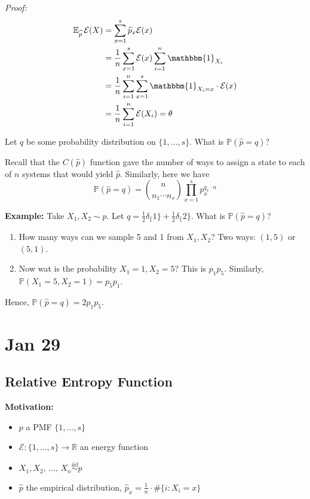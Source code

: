 \documentclass[12pt]{article}
\renewcommand{\hat}[1]{\widehat{#1}}
\renewcommand{\P}{\mathbb{P}}
\newcommand{\R}{\mathbb{R}}
\newcommand{\E}{\mathbb{E}}
\newcommand{\ind}{\mathbbm{1}}
\newcommand{\Ec}{\mathcal{E}}
\newcommand{\iid}{\overset{\text{iid}}{\sim}}
\newcommand*{\tbf}[1]{\ifmmode\mathbf{#1}\else\textbf{#1}\fi}
\newenvironment*{tbox}[2][gray]{
    \begin{tcolorbox}[
        parbox=false,
        colback=#1!5!white,
        colframe=#1!75!black,
        breakable,
        title={#2}
    ]}
    {\end{tcolorbox}}
\begin{document}
\begin{tbox}{\textbf{Large Deviation Principle:} Take $p$ on $\{1, 2, \dots, s\}$, $\Ec: \{1, \dots, s\} \to \R$. Observe $X_1, X_2, \, \dots,\, X_n \overset{\text{iid}}{\sim} p$. Define
        \[\frac{1}{n}\sum_{x=1}^n \Ec(X_k) = \theta\]. Define the empirical distribution $\hat p_x = \frac{1}{n}\cdot \#\{i: X_i = x\}$. Then $\E_{\hat p}\, \Ec(X) = \theta$}

    \emph{Proof:}
    \begin{align*}
        \E_{\hat p}\, \Ec(X) & = \sum_{x=1}^s \hat p_x \Ec(x)                                   \\
                             & = \frac{1}{n}\sum_{x=1}^s \Ec(x) \sum_{i=1}^n \ind_{X_i}         \\
                             & = \frac{1}{n}\sum_{i=1}^n \sum_{x=1}^s \ind_{X_i=x} \cdot \Ec(x) \\
                             & = \frac{1}{n} \sum_{i=1}^{n} \Ec(X_i) = \theta
    \end{align*}
\end{tbox}

Let $q$ be some probability distribution on $\{1, \dots, s\}$. What is $\P(\hat p = q)$?

Recall that the $C(\hat p)$ function gave the number of ways to assign a state to each of $n$ systems that would yield $\hat p$. Similarly, here we have
\[\P(\hat p = q) = \binom{n}{n_1 \cdots n_s} \prod_{x=1}^s p_x^{q_x \cdot n}\]

\tbf{Example:} Take $X_1, X_2 \sim p$. Let $q = \frac{1}{2} \delta_\{1\} + \frac{1}{2} \delta_\{2\}$. What is $\P(\hat p = q)$?
\begin{enumerate}
    \item How many ways can we sample 5 and 1 from $X_1, X_2$? Two ways: $(1, 5)$ or $(5, 1)$.
    \item Now wat is the probability $X_1 = 1, X_2 = 5$? This is $p_1 p_5$. Similarly, $\P(X_1 = 5, X_2 = 1) = p_5 p_1$.
\end{enumerate}

Hence, $\P(\hat p = q) = 2p_1 p_5$.

\section{Jan 29}
\subsection{Relative Entropy Function}
\tbf{Motivation:}
\begin{itemize}
    \item $p$ a PMF $\{1, \dots, s\}$
    \item $\Ec: \{1, \dots, s\} \to \R$ an energy function
    \item $X_1, X_2, \, \dots,\, X_n \iid p$
    \item $\hat p$ the empirical distribution, $\hat p_x = \frac{1}{n}\cdot \#\{i: X_i = x\}$
\end{itemize}
\end{document}
